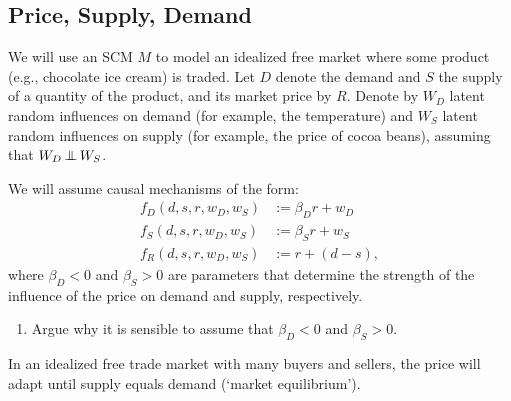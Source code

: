 \subsection{Price, Supply, Demand}

We will use an SCM $M$ to model an idealized free market where some product (e.g., chocolate ice cream) is traded.
Let $D$ denote the demand and $S$ the supply of a quantity of the product, and its market price by $R$.
Denote by $W_D$ latent random influences on demand (for example, the temperature) and $W_S$ latent random influences on supply (for example, the price of cocoa beans), assuming that $W_D \operatorname*{\perp\mkern-11mu\perp} W_S$.

We will assume causal mechanisms of the form:
$$
  \begin{aligned}
    f_D(d,s,r,w_D,w_S) &:= \beta_D r + w_D \\
    f_S(d,s,r,w_D,w_S) &:= \beta_S r + w_S \\
    f_R(d,s,r,w_D,w_S) &:= r + (d - s),
  \end{aligned}
$$
where $\beta_D<0$ and $\beta_S>0$ are parameters that determine the strength of the influence of the price on demand and supply, respectively.
\begin{enumerate}[label=\alph*)]
  \item Argue why it is sensible to assume that $\beta_D<0$ and $\beta_S>0$.
\end{enumerate}
In an idealized free trade market with many buyers and sellers, the price will adapt until supply equals demand (`market equilibrium'). 
